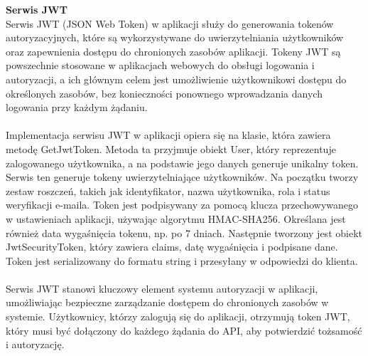 \documentclass[12pt,a4paper]{article}
\begin{document}
\noindent \textbf{Serwis JWT}\\
Serwis JWT (JSON Web Token) w aplikacji służy do generowania tokenów autoryzacyjnych, które są wykorzystywane do uwierzytelniania użytkowników oraz zapewnienia dostępu do chronionych zasobów aplikacji. Tokeny JWT są powszechnie stosowane w aplikacjach webowych do obsługi logowania i autoryzacji, a ich głównym celem jest umożliwienie użytkownikowi dostępu do określonych zasobów, bez konieczności ponownego wprowadzania danych logowania przy każdym żądaniu.
\\\\
Implementacja serwisu JWT w aplikacji opiera się na klasie, która zawiera metodę GetJwtToken. Metoda ta przyjmuje obiekt User, który reprezentuje zalogowanego użytkownika, a na podstawie jego danych generuje unikalny token. Serwis ten generuje tokeny uwierzytelniające użytkowników. Na początku tworzy zestaw roszczeń, takich jak identyfikator, nazwa użytkownika, rola i status weryfikacji e-maila. Token jest podpisywany za pomocą klucza przechowywanego w ustawieniach aplikacji, używając algorytmu HMAC-SHA256. Określana jest również data wygaśnięcia tokenu, np. po 7 dniach. Następnie tworzony jest obiekt JwtSecurityToken, który zawiera claims, datę wygaśnięcia i podpisane dane. Token jest serializowany do formatu string i przesyłany w odpowiedzi do klienta.
\\\\
Serwis JWT stanowi kluczowy element systemu autoryzacji w aplikacji, umożliwiając bezpieczne zarządzanie dostępem do chronionych zasobów w systemie. Użytkownicy, którzy zalogują się do aplikacji, otrzymują token JWT, który musi być dołączony do każdego żądania do API, aby potwierdzić tożsamość i autoryzację.

\newpage
\end{document}
